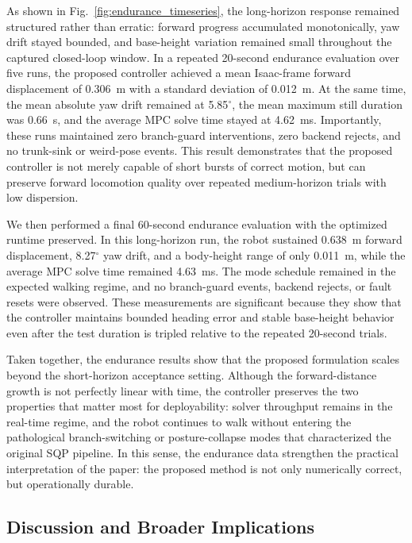 As shown in Fig.~\ref{fig:endurance_timeseries}, the long-horizon response remained structured rather than erratic: forward progress accumulated monotonically, yaw drift stayed bounded, and base-height variation remained small throughout the captured closed-loop window. In a repeated 20-second endurance evaluation over five runs, the proposed controller achieved a mean Isaac-frame forward displacement of 0.306~m with a standard deviation of 0.012~m. At the same time, the mean absolute yaw drift remained at 5.85$^\circ$, the mean maximum still duration was 0.66~s, and the average MPC solve time stayed at 4.62~ms. Importantly, these runs maintained zero branch-guard interventions, zero backend rejects, and no trunk-sink or weird-pose events. This result demonstrates that the proposed controller is not merely capable of short bursts of correct motion, but can preserve forward locomotion quality over repeated medium-horizon trials with low dispersion.

We then performed a final 60-second endurance evaluation with the optimized runtime preserved. In this long-horizon run, the robot sustained 0.638~m forward displacement, 8.27$^\circ$ yaw drift, and a body-height range of only 0.011~m, while the average MPC solve time remained 4.63~ms. The mode schedule remained in the expected walking regime, and no branch-guard events, backend rejects, or fault resets were observed. These measurements are significant because they show that the controller maintains bounded heading error and stable base-height behavior even after the test duration is tripled relative to the repeated 20-second trials.

Taken together, the endurance results show that the proposed formulation scales beyond the short-horizon acceptance setting. Although the forward-distance growth is not perfectly linear with time, the controller preserves the two properties that matter most for deployability: solver throughput remains in the real-time regime, and the robot continues to walk without entering the pathological branch-switching or posture-collapse modes that characterized the original SQP pipeline. In this sense, the endurance data strengthen the practical interpretation of the paper: the proposed method is not only numerically correct, but operationally durable.

\subsection{Discussion and Broader Implications}


